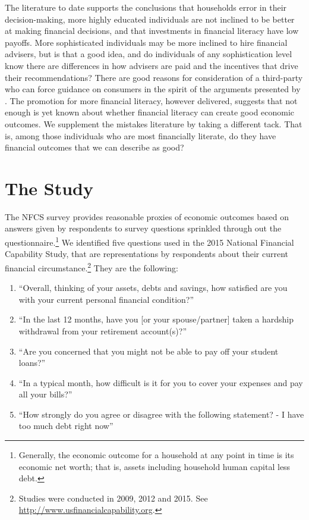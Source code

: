 \documentclass[12pt]{article}
\theoremstyle{plain}
\begin{document}
The literature to date supports the conclusions that households error in their decision-making, more highly educated individuals are not inclined to be better at making financial decisions, and that investments in financial literacy have low payoffs.   More sophisticated individuals may be more inclined to hire financial advisers, but is that a good idea, and do individuals of any sophistication level know there are differences in how advisers are paid and the incentives that drive their recommendations?   There are good reasons for consideration of a third-party who can force guidance on consumers in the spirit of the arguments presented by \cite{elylecture}.   The promotion for more financial literacy, however delivered, suggests that not enough is yet known about whether financial literacy can create good economic outcomes.  We supplement the mistakes literature by taking a different tack.  That is, among those individuals who are most financially literate, do they have financial outcomes that we can describe as good?

\section{The Study}
The NFCS survey provides reasonable proxies of economic outcomes based on answers given by respondents to survey questions sprinkled through out the questionnaire.\footnote{Generally, the economic outcome for a household at any point in time is its economic net worth; that is, assets including household human capital less debt.}    We identified five questions used in the 2015 National Financial Capability Study, that are representations by respondents about their current financial circumstance.\footnote{Studies were conducted in 2009, 2012 and 2015.  See \href{http://www.usfinancialcapability.org}{http://www.usfinancialcapability.org}.}  They are the following:

\begin{enumerate}
\item ``Overall, thinking of your assets, debts and savings, how satisfied are you with your current personal financial condition?'' %
\item ``In the last 12 months, have you [or your spouse/partner] taken a
hardship withdrawal from your retirement account(s)?'' %
\item ``Are you concerned that you might not be able to pay off your student loans?'' %
\item ``In a typical month, how difficult is it for you to cover your expenses and pay all your bills?'' %
\item ``How strongly do you agree or disagree with the following statement? - I have too much debt right now'' %
\end{enumerate}
\end{document}
